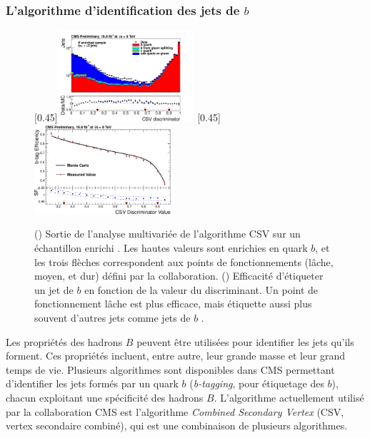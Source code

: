 \subsubsection{L'algorithme d'identification des jets de $b$} \label{sec:b_tagging}

\begin{figure}[tbp]
    \centering
    \subcaptionbox{\label{fig:btag_discri}}[0.45\textwidth]{\includegraphics[width=0.45\textwidth]{chapitre3/figs/btag_tt_csv.pdf}} \hfill
    \subcaptionbox{\label{fig:btag_csv_eff}}[0.45\textwidth]{\includegraphics[width=0.45\textwidth]{chapitre3/figs/btag_csv_eff.pdf}}
    \caption{() Sortie de l'analyse multivariée de l'algorithme CSV sur un échantillon enrichi \ttbar. Les hautes valeurs sont enrichies en quark $b$, et les trois flèches correspondent aux points de fonctionnements (lâche, moyen, et dur) défini par la collaboration. () Efficacité d'étiqueter un jet de $b$ en fonction de la valeur du discriminant. Un point de fonctionnement lâche est plus efficace, mais étiquette aussi plus souvent d'autres jets comme jets de $b$ \citep{btag_perf}.}
    \label{fig:btag_perf}
\end{figure}


Les propriétés des hadrons $B$ peuvent être utilisées pour identifier les jets qu'ils forment. Ces propriétés incluent, entre autre, leur grande masse et leur grand temps de vie. Plusieurs algorithmes sont disponibles dans CMS permettant d'identifier les jets formés par un quark $b$ (\emph{b-tagging}, pour étiquetage des $b$), chacun exploitant une spécificité des hadrons $B$. L'algorithme actuellement utilisé par la collaboration CMS est l'algorithme \emph{Combined Secondary Vertex} (CSV, vertex secondaire combiné), qui est une combinaison de plusieurs algorithmes.

